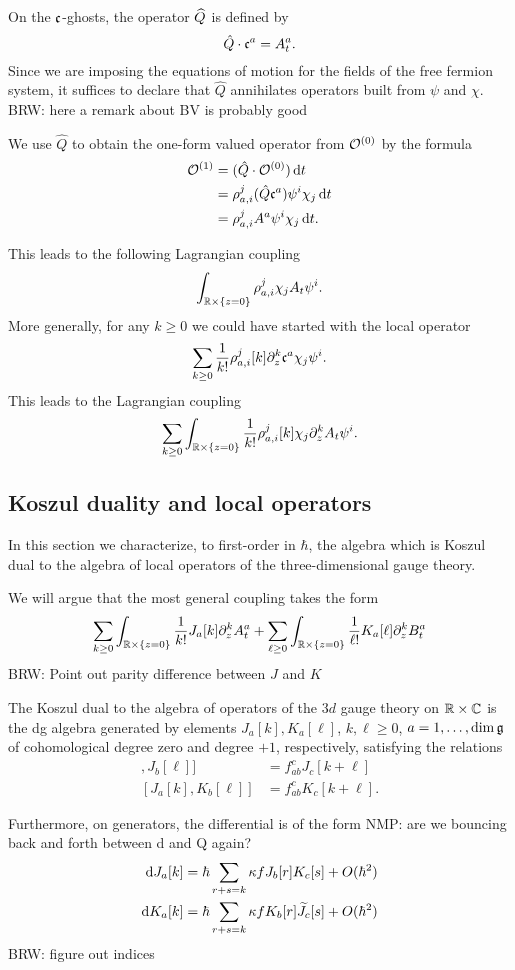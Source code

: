 \documentclass[11pt]{amsart}
\def\brian#1{{\textcolor{blue!65!red}{BRW: {#1}}}}
\def\natalie#1{{\textcolor{green!65!black}{NMP: {#1}}}}
\begin{document}
On the $\fc$-ghosts, the operator $\Hat{Q}$ is defined by 
\[
\hat{Q} \cdot \fc^a = A^a_t  .
\]
Since we are imposing the equations of motion for the fields of the free fermion system, it suffices to declare that $\hat{Q}$ annihilates operators built from $\psi$ and $\chi$. 
\brian{here a remark about BV is probably good}

We use $\hat{Q}$ to obtain the one-form valued operator from $\cO^{(0)}$ by the formula
\begin{align*}
\cO^{(1)} & = (\hat{Q} \cdot \cO^{(0)}) \, \d t \\
& = \rho_{a,i}^j (\hat{Q} \fc^a) \psi^i \chi_j \, \d t \\ 
& = \rho_{a,i}^j A^a \psi^i \chi_j \, \d t .
\end{align*}

This leads to the following Lagrangian coupling
\[
\int_{\RR \times \{z=0\}} \rho_{a,i}^j \chi_j  A_t \psi^i  .
\]
More generally, for any $k \geq 0$ we could have started with the local operator 
\[
\sum_{k \geq 0} \frac1{k!} \rho_{a,i}^j [k] \partial_z^k \fc^a \chi_j \psi^i .
\]
This leads to the Lagrangian coupling
\[
\sum_{k \geq 0} \int_{\RR \times \{z=0\}} \frac{1}{k!} \rho_{a,i}^j[k] \chi_j \partial_z^k A_t \psi^i .
\]



\subsection*{Koszul duality and local operators}

In this section we characterize, to first-order in $\hbar$, the algebra which is Koszul dual to the algebra of local operators of the three-dimensional gauge theory.

We will argue that the most general coupling takes the form
\[
\sum_{k \geq 0} \int_{\RR \times \{z=0\}} \frac{1}{k!} J_a [k] \partial_z^k A^a_t + \sum_{\ell \geq 0} \int_{\RR \times \{z=0\}} \frac{1}{\ell!} K_a[\ell] \partial_z^k B_t^a 
\] 
\brian{Point out parity difference between $J$ and $K$}

\begin{prop}
The Koszul dual to the algebra of operators of the $3d$ gauge theory on $\RR \times \CC$ is the dg algebra generated by elements $J_a[k],K_a [\ell]$, $k,\ell \geq 0$, $a = 1,\ldots, \dim \fg$ of cohomological degree zero and degree $+1$, respectively, satisfying the relations
\begin{align*}
[J_a [k] , J_b [\ell]] & = f_{ab}^c J_{c} [k+\ell] \\
[J_a [k], K_b[\ell]] & = f_{ab}^c K_c [k+\ell] .
\end{align*} 

Furthermore, on generators, the differential is of the form \natalie{are we bouncing back and forth between d and Q again?}
\begin{align*}
\d J_a[k] & = \hbar \sum_{r + s = k} \kappa f J_b[r] K_c[s] + O(\hbar^2) \\
\d K_a[k] & = \hbar \sum_{r + s = k} \kappa f K_b[r] \Tilde{J}_c[s] + O(\hbar^2)
\end{align*} 
\brian{figure out indices}
\end{prop}
\end{document}
